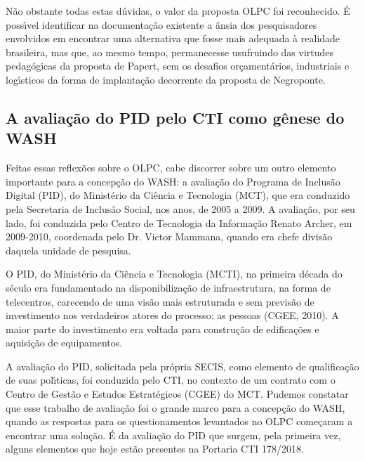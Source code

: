 \documentclass[
12pt,		%
openright,	%
twoside,  %
a4paper,			%
chapter=TITLE,		%
english,			%
french,				%
spanish,			%
brazil				%
]{USPSC-classe/USPSC}
\begin{document}
N\~ao obstante todas estas d\'uvidas, o valor da proposta OLPC foi reconhecido. \'E poss\'{\i}vel identificar na documenta\c{c}\~ao existente a \^ansia dos pesquisadores envolvidos em encontrar uma alternativa que fosse mais adequada \`a realidade brasileira, mas que, ao mesmo tempo, permanecesse usufruindo das virtudes pedag\'ogicas da proposta de Papert, sem os desafios or\c{c}ament\'arios, industriais e log\'{\i}sticos da forma de implanta\c{c}\~ao decorrente da proposta de Negroponte.









\subsection[A avalia\c{c}\~ao do PID pelo CTI como g\^enese do WASH]{A avalia\c{c}\~ao do PID pelo CTI como g\^enese do WASH}\label{A avalia\c{c}\~ao do PID pelo CTI como g\^enese do WASH}
Feitas essas reflex\~oes sobre o OLPC, cabe discorrer sobre um outro elemento importante para a concep\c{c}\~ao do WASH: a avalia\c{c}\~ao do Programa de Inclus\~ao Digital (PID), do Minist\'erio da Ci\^encia e Tecnologia (MCT), que era conduzido pela Secretaria de Inclus\~ao Social, nos anos, de 2005 a 2009. A avalia\c{c}\~ao, por seu lado, foi conduzida pelo Centro de Tecnologia da Informa\c{c}\~ao Renato Archer, em 2009-2010, coordenada pelo Dr. Victor Mammana, quando era chefe divis\~ao daquela unidade de pesquisa.









O PID, do Minist\'erio da Ci\^encia e Tecnologia (MCTI), na primeira d\'ecada do s\'eculo era fundamentado na disponibiliza\c{c}\~ao de infraestrutura, na forma de telecentros, carecendo de uma vis\~ao mais estruturada e sem previs\~ao de investimento nos verdadeiros atores do processo: as pessoas (CGEE, 2010). A maior parte do investimento era voltada para constru\c{c}\~ao de edifica\c{c}\~oes e aquisi\c{c}\~ao de equipamentos.









A avalia\c{c}\~ao do PID, solicitada pela pr\'opria SECIS, como elemento de qualifica\c{c}\~ao de suas pol\'{\i}ticas, foi conduzida pelo CTI, no contexto de um contrato com o Centro de Gest\~ao e Estudos Estrat\'egicos (CGEE) do MCT. Pudemos constatar que esse trabalho de avalia\c{c}\~ao foi o grande marco para a concep\c{c}\~ao do WASH, quando as respostas para os questionamentos levantados no OLPC come\c{c}aram a encontrar uma solu\c{c}\~ao. \'E da avalia\c{c}\~ao do PID que surgem, pela primeira vez, alguns elementos que hoje est\~ao presentes na Portaria CTI 178/2018.
\end{document}
